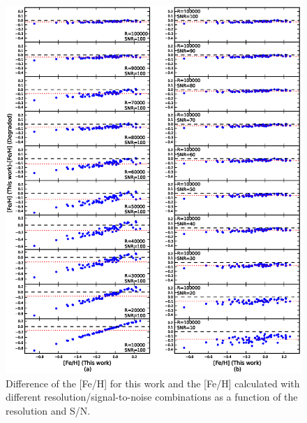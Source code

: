 \documentclass{aa}
\begin{document}
\begin{figure}[]
\begin{center}
\includegraphics[scale=0.9]{pics/resnr_fehv2.eps}
\end{center}
\caption{Difference of the [Fe/H] for this work and the [Fe/H] calculated with different resolution/signal-to-noise combinations as a function of the resolution and S/N.}
\label{fig:resnr-feh}
\end{figure}
\end{document}
